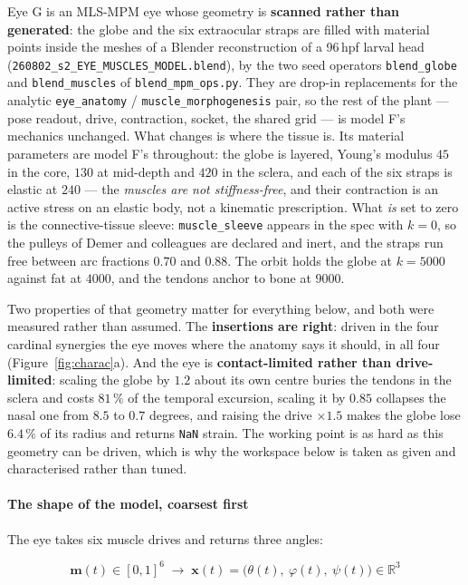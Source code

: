 \documentclass[10pt]{article}
\begin{document}
Eye G is an MLS-MPM eye whose geometry is \textbf{scanned rather than generated}: the globe
and the six extraocular straps are filled with material points inside the meshes of a
Blender reconstruction of a 96\,hpf larval head
(\texttt{260802\_s2\_EYE\_MUSCLES\_MODEL.blend}), by the two seed operators
\texttt{blend\_globe} and \texttt{blend\_muscles} of \texttt{blend\_mpm\_ops.py}. They are
drop-in replacements for the analytic \texttt{eye\_anatomy} / \texttt{muscle\_morphogenesis}
pair, so the rest of the plant --- pose readout, drive, contraction, socket, the shared grid
--- is model F's mechanics unchanged. What changes is where the tissue is. Its material
parameters are model F's throughout: the globe is layered, Young's modulus $45$ in the core,
$130$ at mid-depth and $420$ in the sclera, and each of the six straps is elastic at $240$
--- the \emph{muscles are not stiffness-free}, and their contraction is an active stress on
an elastic body, not a kinematic prescription. What \emph{is} set to zero is the
connective-tissue sleeve: \texttt{muscle\_sleeve} appears in the spec with $k=0$, so the
pulleys of Demer and colleagues are declared and inert, and the straps run free between arc
fractions $0.70$ and $0.88$. The orbit holds the globe at $k=5000$ against fat at $4000$,
and the tendons anchor to bone at $9000$.

Two properties of that geometry matter for everything below, and both were measured rather
than assumed. The \textbf{insertions are right}: driven in the four cardinal synergies the
eye moves where the anatomy says it should, in all four (Figure~\ref{fig:charac}a). And the
eye is \textbf{contact-limited rather than drive-limited}: scaling the globe by $1.2$ about
its own centre buries the tendons in the sclera and costs $81\,\%$ of the temporal
excursion, scaling it by $0.85$ collapses the nasal one from $8.5$ to $0.7$ degrees, and
raising the drive $\times 1.5$ makes the globe lose $6.4\,\%$ of its radius and returns
\texttt{NaN} strain. The working point is as hard as this geometry can be driven, which is
why the workspace below is taken as given and characterised rather than tuned.

\paragraph{The shape of the model, coarsest first}

The eye takes six muscle drives and returns three angles:

\begin{equation}
\mathbf{m}(t)\in[0,1]^{6}
\;\longrightarrow\;
\mathbf{x}(t)=\big(\theta(t),\ \varphi(t),\ \psi(t)\big)\in\mathbb{R}^{3}
\label{eq:eye-io}
\end{equation}
\end{document}
